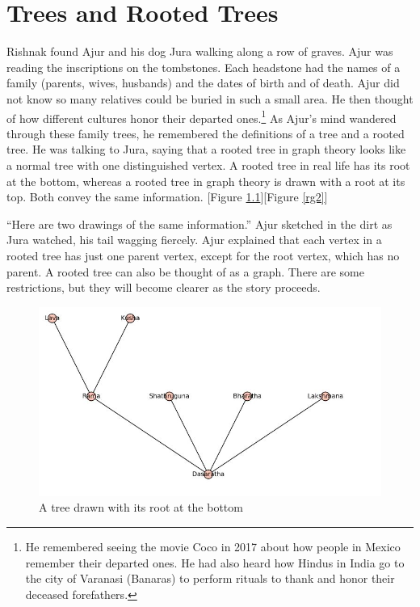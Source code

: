 \chapter{Trees and Rooted Trees}

Rishnak found Ajur and his dog Jura walking along a row of graves. Ajur was reading the inscriptions on the tombstones. Each headstone had the names of a family (parents, wives, husbands) and the dates of birth and of death. Ajur did not know so many relatives could be buried in such a small area. He then thought of how different cultures honor their departed ones.\footnote{He remembered seeing the movie Coco in 2017 about how people in Mexico remember their departed ones. He had also heard how Hindus in India go to the city of Varanasi (Banaras) to perform rituals to thank and honor their deceased forefathers.}
As Ajur's mind wandered through these family trees, he remembered the definitions of a tree and a rooted tree. He was talking to Jura, saying that a rooted tree in graph theory looks like a normal tree with one distinguished vertex. A rooted tree  in real life has its root at the bottom, whereas a rooted tree in graph theory is drawn with a root at its top. Both convey the same information. [Figure \ref{rg1}][Figure \ref{rg2}]

``Here are two drawings of the same information.'' Ajur sketched in the dirt as Jura watched, his tail wagging fiercely. Ajur explained that each vertex in a rooted tree has just one parent vertex, except for the root vertex, which has no parent. A rooted tree can also be thought of as a graph. There are some restrictions, but they will become clearer as the story proceeds.


\begin{figure}
\begin{center}
\includegraphics[width=\textwidth]{tree1.JPG}
\caption{A tree drawn with its root at the bottom}\label{rg1}
\end{center}
\end{figure}

